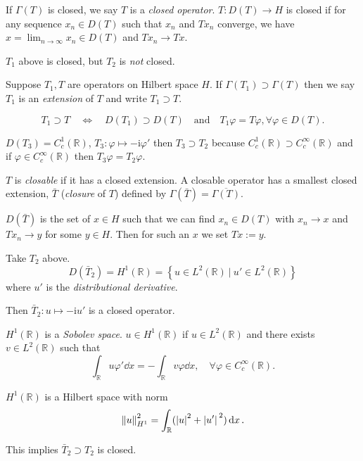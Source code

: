\documentclass[a4paper,11pt]{article}
\begin{document}
	If $\Gamma(T)$ is closed, we say $T$ is a \emph{closed operator}. $T : D(T) \to H$ is closed if for any sequence $x_n \in D(T)$ such that $x_n$ and $T x_n$ converge, we have $x = \lim _{n \to \infty} x_n \in D(T)$ and $T x_n \to T x$.

	\begin{ex}
		$T_1$ above is closed, but $T_2$ is \emph{not} closed.
	\end{ex}

	Suppose $T_1, T$ are operators on Hilbert space $H$. If $\Gamma(T_1) \supset \Gamma(T)$ then we say $T_1$ is an \emph{extension} of $T$ and write $T_1 \supset T$.

	\[
		T_1 \supset T \quad \Leftrightarrow \quad D(T_1) \supset D(T) \quad \text{and} \quad T_1 \varphi = T \varphi, \forall \varphi \in D(T).
	\]
	
	\begin{ex}
		$D(T_3) = C^1_c (\mathbb{R})$, $T_3 : \varphi \mapsto - \mathrm{i} \varphi'$ then $T_3 \supset T_2$ because $C^1_c(\mathbb{R}) \supset C ^{\infty}_c (\mathbb{R})$ and if $\varphi \in C ^{\infty}_{c}(\mathbb{R})$ then $T_3 \varphi = T_2 \varphi$.  
	\end{ex}

	$T$ is \emph{closable} if it has a closed extension. A closable operator has a smallest closed extension, $\bar T$ (\emph{closure} of $T$) defined by $\Gamma(\bar T) = \overline{\Gamma(T)}$. 

	$D(\bar T)$ is the set of $x \in H$ such that we can find $x_n \in D(T)$ with $x_n \to x$ and $T x_n \to y$ for some $y \in H$. Then for such an $x$ we set $Tx := y$.
	
	\begin{ex}
		Take $T_2$ above. 
		\[
			D(\bar T_2) = H^1 (\mathbb{R}) = \left\{ u \in L^2(\mathbb{R})\ |\ u' \in L^2(\mathbb{R}) \right\}
		\]
		where $u'$ is the \emph{distributional derivative}.

		Then $\bar T_2 : u \mapsto - \mathrm{i} u'$ is a closed operator.

		$H^1(\mathbb{R})$ is a \emph{Sobolev space}. $u \in H^1(\mathbb{R})$ if $u\in L^2(\mathbb{R})$ and there exists $v \in L^2(\mathbb{R})$ such that 
		\[
			\int _{\mathbb{R}} u \varphi' \dd{x} = - \int _{\mathbb{R}} v \varphi \dd{x}, \quad \forall \varphi \in C ^{\infty}_c (\mathbb{R}).
		\]

		$H^1(\mathbb{R})$ is a Hilbert space with norm
		\[
			\norm{u}_{H^1}^2 = \int _{\mathbb{R}} (\abs{u}^2 + \abs*{u'}^2) \dd{x}.
		\]
		
		This implies $\bar T_2 \supset T_2$ is closed.
	\end{ex}
	
\end{document}
